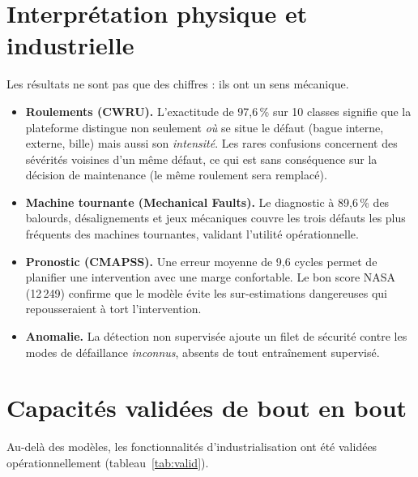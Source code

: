 \section{Interprétation physique et industrielle}
Les résultats ne sont pas que des chiffres : ils ont un sens mécanique.
\begin{itemize}[leftmargin=1.5em]
  \item \textbf{Roulements (CWRU).} L'exactitude de 97{,}6\,\% sur 10 classes signifie que la
        plateforme distingue non seulement \emph{où} se situe le défaut (bague interne,
        externe, bille) mais aussi son \emph{intensité}. Les rares confusions concernent des
        sévérités voisines d'un même défaut, ce qui est sans conséquence sur la décision de
        maintenance (le même roulement sera remplacé).
  \item \textbf{Machine tournante (Mechanical Faults).} Le diagnostic à 89{,}6\,\% des
        balourds, désalignements et jeux mécaniques couvre les trois défauts les plus
        fréquents des machines tournantes, validant l'utilité opérationnelle.
  \item \textbf{Pronostic (CMAPSS).} Une erreur moyenne de 9{,}6 cycles permet de planifier
        une intervention avec une marge confortable. Le bon score NASA (12\,249) confirme que
        le modèle évite les sur-estimations dangereuses qui repousseraient à tort
        l'intervention.
  \item \textbf{Anomalie.} La détection non supervisée ajoute un filet de sécurité contre les
        modes de défaillance \emph{inconnus}, absents de tout entraînement supervisé.
\end{itemize}

\section{Capacités validées de bout en bout}
Au-delà des modèles, les fonctionnalités d'industrialisation ont été validées
opérationnellement (tableau~\ref{tab:valid}).


